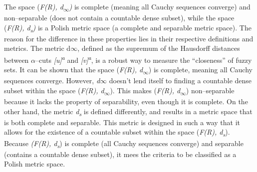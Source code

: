 \documentclass[12pt,a4paper]{report}
\numberwithin{equation}{section}
\begin{document}
The space (\emph{F(R), d\textsubscript{$\infty$})} is complete (meaning all
Cauchy sequences converge) and non--separable (does not contain a
countable dense subset), while the space (\emph{F(R),
d\textsubscript{s})} is a Polish metric space (a complete and separable
metric space). The reason for the difference in these properties lies in
their respective definitions and metrics. The metric d$\infty$, defined as the
supremum of the Hausdorff distances between $\alpha$--cuts \emph{{[}u{]}\textsuperscript{a}} and
\emph{{[}v{]}\textsuperscript{a}}, is a robust way to measure the
``closeness'' of fuzzy sets. It can be shown that the space (\emph{F(R),
d\textsubscript{$\infty$}}) is complete, meaning all Cauchy sequences converge.
However, \emph{d$\infty$} doesn't lend itself to finding a countable dense
subset within the space (\emph{F(R), d\textsubscript{$\infty$}}). This makes
(\emph{F(R), d\textsubscript{$\infty$}}) non--separable because it lacks the
property of separability, even though it is complete. On the other hand,
the metric \emph{d\textsubscript{s}} is defined differently, and results
in a metric space that is both complete and separable. This metric is
designed in such a way that it allows for the existence of a countable
subset within the space (\emph{F(R),
d\textsubscript{s}}\textsubscript{}). Because \emph{(F(R),
d\textsubscript{s}}) is complete (all Cauchy sequences converge) and
separable (contains a countable dense subset), it mees the criteria to
be classified as a Polish metric space.
\end{document}

